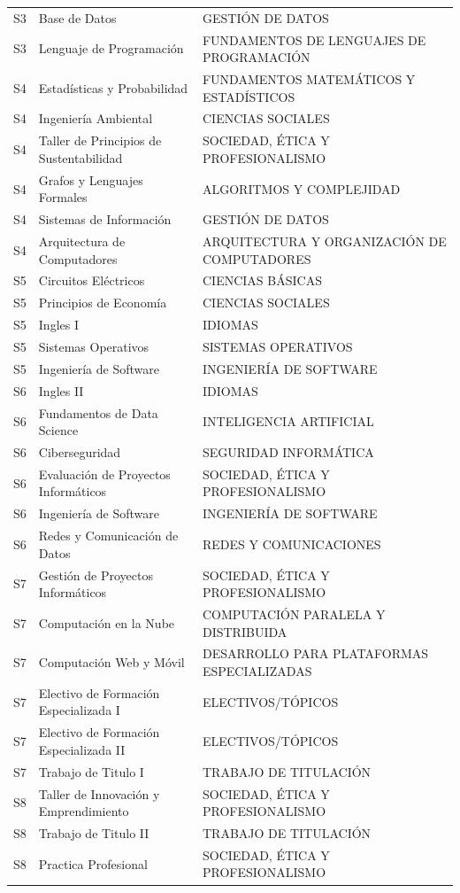 \documentclass[11pt,a4paper]{article}
\begin{document}
\begin{small}
\begin{longtable}{c >{\raggedright\arraybackslash}p{8.5cm} >{\raggedright\arraybackslash}p{5.5cm}}
S3 & Base de Datos & GESTIÓN DE DATOS \\
S3 & Lenguaje de Programación & FUNDAMENTOS DE LENGUAJES DE PROGRAMACIÓN \\
S4 & Estadísticas y Probabilidad & FUNDAMENTOS MATEMÁTICOS Y ESTADÍSTICOS \\
S4 & Ingeniería Ambiental & CIENCIAS SOCIALES \\
S4 & Taller de Principios de Sustentabilidad & SOCIEDAD, ÉTICA Y PROFESIONALISMO \\
S4 & Grafos y Lenguajes Formales & ALGORITMOS Y COMPLEJIDAD \\
S4 & Sistemas de Información & GESTIÓN DE DATOS \\
S4 & Arquitectura de Computadores & ARQUITECTURA Y ORGANIZACIÓN DE COMPUTADORES \\
S5 & Circuitos Eléctricos & CIENCIAS BÁSICAS \\
S5 & Principios de Economía & CIENCIAS SOCIALES \\
S5 & Ingles I & IDIOMAS \\
S5 & Sistemas Operativos & SISTEMAS OPERATIVOS \\
S5 & Ingeniería de Software & INGENIERÍA DE SOFTWARE \\
S6 & Ingles II & IDIOMAS \\
S6 & Fundamentos de Data Science & INTELIGENCIA ARTIFICIAL \\
S6 & Ciberseguridad & SEGURIDAD INFORMÁTICA \\
S6 & Evaluación de Proyectos Informáticos & SOCIEDAD, ÉTICA Y PROFESIONALISMO \\
S6 & Ingeniería de Software & INGENIERÍA DE SOFTWARE \\
S6 & Redes y Comunicación de Datos & REDES Y COMUNICACIONES \\
S7 & Gestión de Proyectos Informáticos & SOCIEDAD, ÉTICA Y PROFESIONALISMO \\
S7 & Computación en la Nube & COMPUTACIÓN PARALELA Y DISTRIBUIDA \\
S7 & Computación Web y Móvil & DESARROLLO PARA PLATAFORMAS ESPECIALIZADAS \\
S7 & Electivo de Formación Especializada I & ELECTIVOS/TÓPICOS \\
S7 & Electivo de Formación Especializada II & ELECTIVOS/TÓPICOS \\
S7 & Trabajo de Titulo I & TRABAJO DE TITULACIÓN \\
S8 & Taller de Innovación y Emprendimiento & SOCIEDAD, ÉTICA Y PROFESIONALISMO \\
S8 & Trabajo de Titulo II & TRABAJO DE TITULACIÓN \\
S8 & Practica Profesional & SOCIEDAD, ÉTICA Y PROFESIONALISMO \\
\end{longtable}
\end{small}
\end{document}
